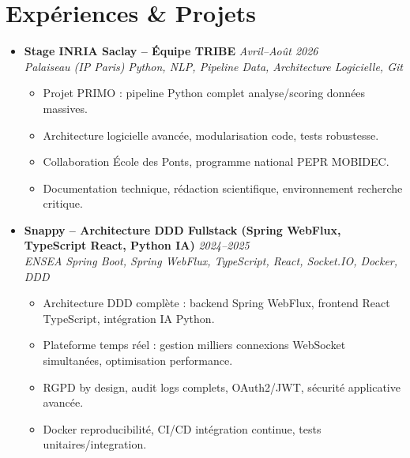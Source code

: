 \documentclass[a4paper,11pt]{article}
\begin{document}
\section{Exp\'eriences \& Projets}
\begin{itemize}[leftmargin=*, label={-}]
    \item \textbf{Stage INRIA Saclay -- \'Equipe TRIBE} \hfill \textit{Avril--Ao\^ut 2026} \\
    \textit{Palaiseau (IP Paris)} \hfill \textit{Python, NLP, Pipeline Data, Architecture Logicielle, Git}
    \vspace{-2pt}
        \begin{itemize}[leftmargin=0.4cm, nosep, label=\tiny$\bullet$]
            \item \small{Projet PRIMO : pipeline Python complet analyse/scoring données massives.}
            \item \small{Architecture logicielle avanc\'ee, modularisation code, tests robustesse.}
            \item \small{Collaboration \'Ecole des Ponts, programme national PEPR MOBIDEC.}
            \item \small{Documentation technique, rédaction scientifique, environnement recherche critique.}
        \end{itemize}
    \vspace{3pt}
    \item \textbf{Snappy -- Architecture DDD Fullstack (Spring WebFlux, TypeScript React, Python IA)} \hfill \textit{2024--2025} \\
    \textit{ENSEA} \hfill \textit{Spring Boot, Spring WebFlux, TypeScript, React, Socket.IO, Docker, DDD}
    \vspace{-2pt}
        \begin{itemize}[leftmargin=0.4cm, nosep, label=\tiny$\bullet$]
            \item \small{Architecture DDD compl\`ete : backend Spring WebFlux, frontend React TypeScript, intégration IA Python.}
            \item \small{Plateforme temps r\'eel : gestion milliers connexions WebSocket simultanées, optimisation performance.}
            \item \small{RGPD by design, audit logs complets, OAuth2/JWT, sécurité applicative avanc\'ee.}
            \item \small{Docker reproducibilité, CI/CD intégration continue, tests unitaires/integration.}
        \end{itemize}
    \vspace{3pt}

\end{itemize}
\end{document}
